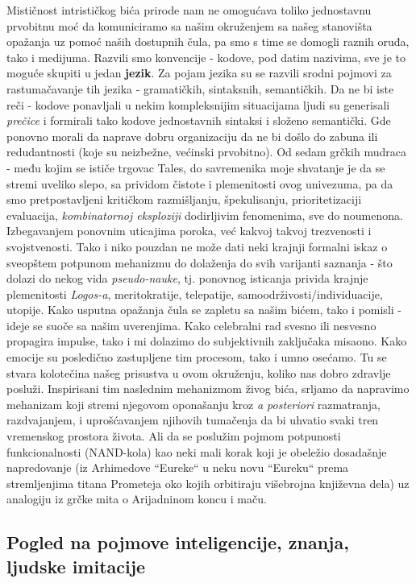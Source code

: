 \documentclass[fontsize=11bp, paper=a4]{scrartcl}
\begin{document}
Mističnost intrističkog bića prirode nam ne omogućava toliko jednostavnu prvobitnu moć da komuniciramo sa našim okruženjem sa našeg stanovišta opažanja uz pomoć naših dostupnih čula, pa smo s time se domogli raznih oruđa, tako i medijuma. 
Razvili smo konvencije - kodove, pod datim nazivima, sve je to moguće skupiti u jedan \textbf{jezik}. Za pojam jezika su se razvili srodni pojmovi za rastumačavanje tih jezika - gramatičkih, sintaksnih, semantičkih.
Da ne bi iste reči - kodove ponavljali u nekim kompleksnijim situacijama ljudi su generisali \textit{prečice} i formirali tako kodove jednostavnih sintaksi i složeno semantički. 
Gde ponovno morali da naprave dobru organizaciju da ne bi došlo do zabuna ili redudantnosti (koje su neizbežne, većinski prvobitno). Od sedam grčkih mudraca - među kojim se ističe trgovac Tales\cite{tales}, do savremenika moje shvatanje je da se stremi uveliko slepo, sa prividom čistote i plemenitosti ovog univezuma, pa da smo pretpostavljeni kritičkom razmišljanju, špekulisanju, prioritetizaciji evaluacija, \textit{kombinatornoj eksploziji} dodirljivim fenomenima, sve do noumenona. Izbegavanjem ponovnim uticajima poroka, već kakvoj takvoj trezvenosti i svojstvenosti.
Tako i niko pouzdan ne može dati neki krajnji formalni iskaz o sveopštem potpunom mehanizmu do dolaženja do svih varijanti saznanja - što dolazi do nekog vida \textit{pseudo-nauke}, tj. ponovnog isticanja privida krajnje plemenitosti \textit{Logos-a}\cite{Logos}, meritokratije, telepatije, samoodrživosti/individuacije\cite{jung}, utopije. Kako usputna opažanja čula se zapletu sa našim bićem, tako i pomisli - ideje se suoče sa našim uverenjima. 
Kako celebralni rad svesno ili nesvesno propagira impulse, tako i mi dolazimo do subjektivnih zaključaka misaono. 
Kako emocije su posledično zastupljene tim procesom, tako i umno osećamo. 
Tu se stvara kolotečina našeg prisustva u ovom okruženju, koliko nas dobro zdravlje posluži. 
Inspirisani tim naslednim mehanizmom živog bića, srljamo da napravimo mehanizam koji stremi njegovom oponašanju kroz \textit{a posteriori} razmatranja, razdvajanjem, i uprošćavanjem njihovih tumačenja da bi uhvatio svaki tren vremenskog prostora života. Ali da se poslužim pojmom potpunosti funkcionalnosti (NAND-kola)\cite{nand} kao neki mali korak koji je obeležio dosadašnje napredovanje (iz Arhimedove ``Eureke``\cite{eureka} u neku novu ``Eureku`` prema stremljenjima titana Prometeja oko kojih orbitiraju višebrojna književna dela) uz analogiju iz grčke mita o Arijadninom koncu i maču\cite{ariadna}.
\subsection{\normalsize{Pogled na pojmove inteligencije, znanja, ljudske imitacije}}
\end{document}
